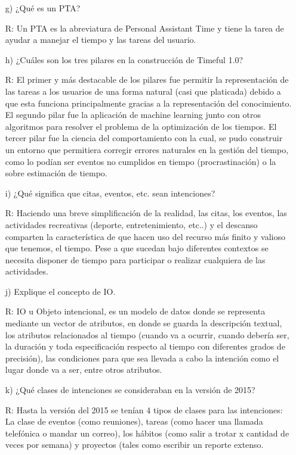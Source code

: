 \documentclass[11pt, letterpaper]{article}
\begin{document}
\begin{enumerate}
		\item[g)] ¿Qué es un PTA?
		
		R: Un PTA es la abreviatura de Personal Assistant Time y tiene la tarea de ayudar a manejar el tiempo y las tareas del usuario.
		
		\item[h)] ¿Cuáles son los tres pilares en la construcción de Timeful 1.0?
		
		R: El primer y más destacable de los pilares fue permitir la representación de las tareas a los usuarios de una forma natural (casi que platicada) debido a que esta funciona principalmente gracias a la representación del conocimiento. El segundo pilar fue la aplicación de machine learning junto con otros algoritmos para resolver el problema de la optimización de los tiempos. El tercer pilar fue la ciencia del comportamiento con la cual, se pudo construir un entorno que permitiera corregir errores naturales en la gestión del tiempo, como lo podían ser eventos no cumplidos en tiempo (procrastinación) o la sobre estimación de tiempo.
		
		\item[i)] ¿Qué significa que citas, eventos, etc. sean intenciones?
		
		R: Haciendo una breve simplificación de la realidad, las citas, los eventos, las actividades recreativas (deporte, entretenimiento, etc..) y el descanso comparten la característica de que hacen uso del recurso más finito y valioso que tenemos, el tiempo. Pese a que sucedan bajo diferentes contextos se necesita disponer de tiempo para participar o realizar cualquiera de las actividades.
		
		\newpage
		
		\item[j)] Explique el concepto de IO.
		
		R: IO u Objeto intencional, es un modelo de datos donde se representa mediante un vector de atributos, en donde se guarda la descripción textual, los atributos relacionados al tiempo (cuando va a ocurrir, cuando debería ser, la duración  y toda especificación respecto al tiempo con diferentes grados de precisión), las condiciones para que sea llevada a cabo la intención como el lugar donde va a ser, entre otros atributos.
		
		\item[k)] ¿Qué clases de intenciones se consideraban en la versión de 2015?
		
		R: Hasta la versión del 2015 se tenían 4 tipos de clases para las intenciones:
		La clase de eventos (como reuniones), tareas (como hacer una llamada telefónica o mandar un correo), los hábitos (como salir a trotar x cantidad de veces por semana) y proyectos (tales como escribir un reporte extenso.
		

\end{enumerate}
\end{document}
